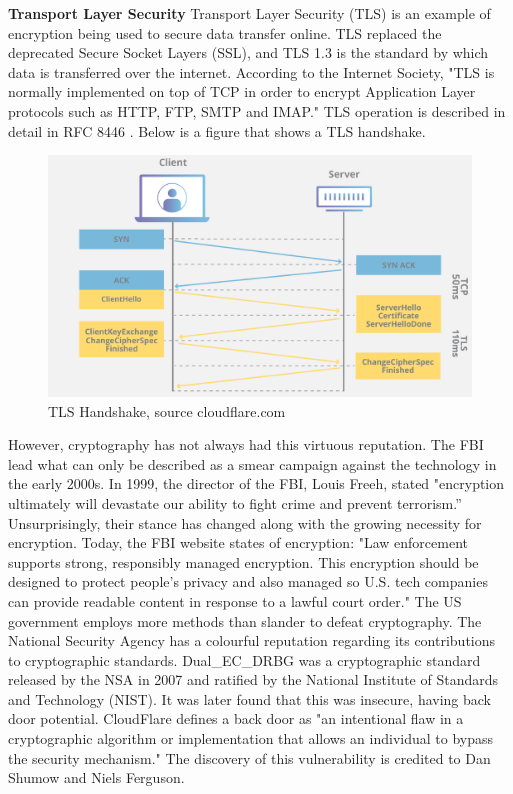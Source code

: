 \textbf{Transport Layer Security}
Transport Layer Security (TLS) is an example of encryption being used to secure data transfer online. TLS replaced the deprecated Secure Socket Layers (SSL), and TLS 1.3 is the standard by which data is transferred over the internet. According to the Internet Society, "TLS is normally implemented on top of TCP in order to encrypt Application Layer protocols such as HTTP, FTP, SMTP and IMAP." \cite{internetsociety_tls_basics} TLS operation is described in detail in RFC 8446 \cite{rfc8446} \cite{cloudflare_tls_handshake}. Below is a figure that shows a TLS handshake.

\begin{figure}
  \centering
  \includegraphics[width=\textwidth]{Circumvention Tools/TLS_Handshake.png}
  \caption{TLS Handshake, source cloudflare.com}
  \label{fig:your_label_here}
\end{figure}

However, cryptography has not always had this virtuous reputation. The FBI lead what can only be described as a smear campaign against the technology in the early 2000s. In 1999, the director of the FBI, Louis Freeh, stated "encryption ultimately will devastate our ability to fight crime and prevent terrorism.” \cite{bitsbook_chapter5} Unsurprisingly, their stance has changed along with the growing necessity for encryption. Today, the FBI website states of encryption: "Law enforcement supports strong, responsibly managed encryption. This encryption should be designed to protect people’s privacy and also managed so U.S. tech companies can provide readable content in response to a lawful court order." \cite{fbi_lawful_access} The US government employs more methods than slander to defeat cryptography. The National Security Agency \cite{nsa_website} has a colourful reputation regarding its contributions to cryptographic standards. Dual\_EC\_DRBG was a cryptographic standard released by the NSA in 2007 and ratified by the National Institute of Standards and Technology (NIST). It was later found that this was insecure, having back door potential. CloudFlare defines a back door as "an intentional flaw in a cryptographic algorithm or implementation that allows an individual to bypass the security mechanism." \cite{cloudflare_nsa_backdoor} The discovery of this vulnerability is credited to Dan Shumow and Niels Ferguson. \cite{schneier_nsa_backdoor}

